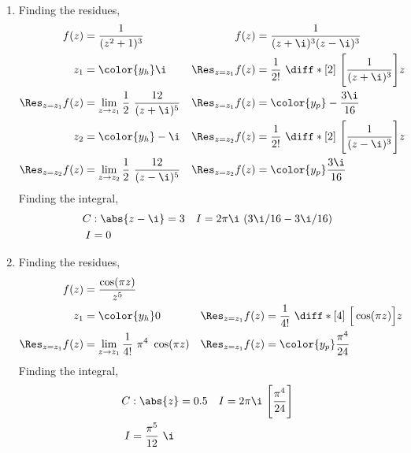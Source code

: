 \begin{enumerate}
    \item Finding the residues,
          \begin{align}
              f(z)                    & = \frac{1}{(z^2 + 1)^3}            &
              f(z)                    & = \frac{1}{(z + \i)^3(z - \i)^3}     \\
              z_1                     & = \color{y_h} \i                   &
              \Res_{z = z_1} f(z)     & = \frac{1}{2!}\ \diff*[2]{\ \Bigg[
              \frac{1}{(z + \i)^3} \Bigg]}{z}                                \\
              \Res_{z = z_1} f(z)     & = \lim_{z \to z_1} \frac{1}{2}
              \ \frac{12}{(z + \i)^5} &
              \Res_{z = z_1} f(z)     & = \color{y_p} -\frac{3\i}{16}        \\
              z_2                     & = \color{y_h} -\i                  &
              \Res_{z = z_2} f(z)     & = \frac{1}{2!}\ \diff*[2]{\ \Bigg[
              \frac{1}{(z - \i)^3} \Bigg]}{z}                                \\
              \Res_{z = z_2} f(z)     & = \lim_{z \to z_2} \frac{1}{2}
              \ \frac{12}{(z - \i)^5} &
              \Res_{z = z_2} f(z)     & = \color{y_p} \frac{3\i}{16}
          \end{align}
          Finding the integral,
          \begin{align}
              C & : \abs{z - \i} = 3          &
              I & = 2\pi\i\ (3\i/16 - 3\i/16)   \\
              I & = 0
          \end{align}

    \item Finding the residues,
          \begin{align}
              f(z)                & = \frac{\cos(\pi z)}{z^5}                \\
              z_1                 & = \color{y_h} 0                        &
              \Res_{z = z_1} f(z) & = \frac{1}{4!}\ \diff*[4]{\ \Big[
              \cos(\pi z) \Big]}{z}                                          \\
              \Res_{z = z_1} f(z) & = \lim_{z \to z_1} \frac{1}{4!}\ \pi^4
              \ \cos(\pi z)       &
              \Res_{z = z_1} f(z) & = \color{y_p} \frac{\pi^4}{24}
          \end{align}
          Finding the integral,
          \begin{align}
              C & : \abs{z} = 0.5                          &
              I & = 2\pi\i\ \Bigg[ \frac{\pi^4}{24} \Bigg]   \\
              I & = \frac{\pi^5}{12}\ \i
          \end{align}


\end{enumerate}
